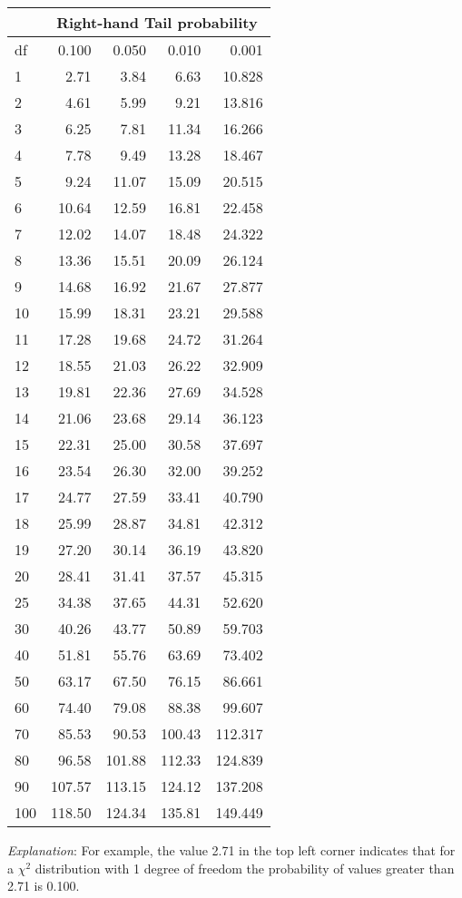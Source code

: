 \begin{center}
\begin{tabular}{|l|rrrr|}\hline
& \multicolumn{4}{|c|}{Right-hand Tail probability} \\ \hline
df	&0.100	&0.050	  &0.010&0.001\\ \hline
1	&2.71	&3.84	  &6.63  & 10.828\\
2	&4.61	&5.99	  &9.21  & 13.816\\
3	&6.25	&7.81	  &11.34 & 16.266\\
4	&7.78	&9.49	  &13.28 & 18.467\\
5	&9.24	&11.07	  &15.09 & 20.515\\
6	&10.64	&12.59	  &16.81 & 22.458\\
7	&12.02	&14.07	  &18.48 & 24.322\\
8	&13.36	&15.51	  &20.09 & 26.124\\
9	&14.68	&16.92	  &21.67 & 27.877\\
10	&15.99	&18.31	  &23.21 & 29.588\\
11	&17.28	&19.68	  &24.72 & 31.264\\
12	&18.55	&21.03	  &26.22 & 32.909\\
13	&19.81	&22.36	  &27.69 & 34.528\\
14	&21.06	&23.68	  &29.14 & 36.123\\
15	&22.31	&25.00	  &30.58 & 37.697\\
16	&23.54	&26.30	  &32.00 & 39.252\\
17	&24.77	&27.59	  &33.41 & 40.790\\
18	&25.99	&28.87	  &34.81 & 42.312\\
19	&27.20	&30.14	  &36.19 & 43.820\\
20	&28.41	&31.41	  &37.57 & 45.315\\
25	&34.38	&37.65	  &44.31 & 52.620\\
30	&40.26	&43.77	  &50.89 & 59.703\\
40	&51.81	&55.76	  &63.69 & 73.402\\
50	&63.17	&67.50	  &76.15 & 86.661\\
60	&74.40	&79.08	  &88.38 & 99.607\\
70	&85.53	&90.53	  &100.43&112.317\\
80	&96.58	&101.88	  &112.33&124.839\\
90	&107.57	&113.15   &124.12&137.208\\
100	&118.50	&124.34	  &135.81&149.449\\
\hline
\end{tabular}
\end{center}
\emph{Explanation}: For example, the value 2.71 in the top left corner
indicates that for a $\chi^{2}$ distribution with 1 degree of freedom
the probability of values greater than 2.71 is 0.100.
